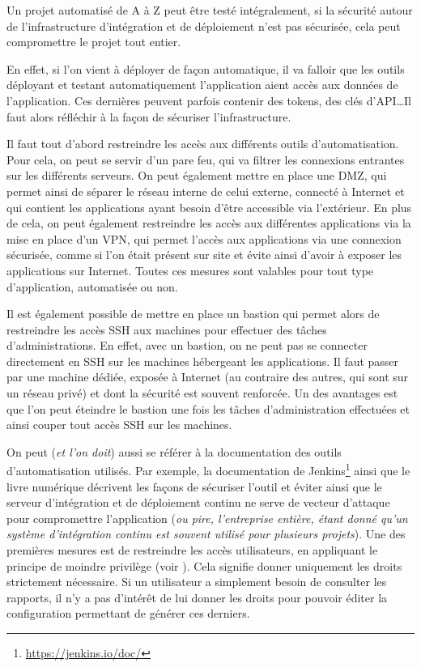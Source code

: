 Un projet automatisé de A à Z peut être testé intégralement, si la sécurité autour de l'infrastructure d'intégration et de déploiement n'est pas sécurisée, cela peut compromettre le projet tout entier.

En effet, si l'on vient à déployer de façon automatique, il va falloir que les outils déployant et testant automatiquement l'application aient accès aux données de l'application. Ces dernières peuvent parfois contenir des tokens, des clés d'\gls{API}\ldots Il faut alors réfléchir à la façon de sécuriser l'infrastructure. 

Il faut tout d'abord restreindre les accès aux différents outils d'automatisation. Pour cela, on peut se servir d'un pare feu, qui va filtrer les connexions entrantes sur les différents serveurs. On peut également mettre en place une \gls{DMZ}, qui permet ainsi de séparer le réseau interne de celui externe, connecté à Internet et qui contient les applications ayant besoin d'être accessible via l'extérieur. En plus de cela, on peut également restreindre les accès aux différentes applications via la mise en place d'un \gls{VPN}, qui permet l'accès aux applications via une connexion sécurisée, comme si l'on était présent sur site et évite ainsi d'avoir à exposer les applications sur Internet. Toutes ces mesures sont valables pour tout type d'application, automatisée ou non. 

Il est également possible de mettre en place un bastion qui permet alors de restreindre les accès \gls{SSH} aux machines pour effectuer des tâches d'administrations. En effet, avec un bastion, on ne peut pas se connecter directement en \gls{SSH} sur les machines hébergeant les applications. Il faut passer par une machine dédiée, exposée à Internet (au contraire des autres, qui sont sur un réseau privé) et dont la sécurité est souvent renforcée. Un des avantages est que l'on peut éteindre le bastion une fois les tâches d'administration effectuées et ainsi couper tout accès \gls{SSH} sur les machines.


On peut (\emph{et l'on doit}) aussi se référer à la documentation des outils d'automatisation utilisés. Par exemple, la documentation de Jenkins\footnote{\url{https://jenkins.io/doc/}} ainsi que le livre numérique  \cite[chapitre 7, Sécuriser Jenkins]{jenkins-guide} décrivent les façons de sécuriser l'outil et éviter ainsi que le serveur d'intégration et de déploiement continu ne serve de vecteur d'attaque pour compromettre l'application (\emph{ou pire, l'entreprise entière, étant donné qu'un système d'intégration continu est souvent utilisé pour plusieurs projets}). Une des premières mesures est de restreindre les accès utilisateurs, en appliquant le principe de moindre privilège (voir  \cite{anssi-least-privilege}). Cela signifie donner uniquement les droits strictement nécessaire. Si un utilisateur a simplement besoin de consulter les rapports, il n'y a pas d'intérêt de lui donner les droits pour pouvoir éditer la configuration permettant de générer ces derniers.

